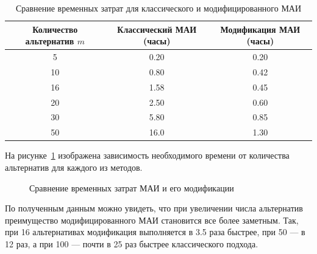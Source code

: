 \begin{landscape}
\vspace*{\fill}
\begin{table}[H]
\centering
\caption{Сравнение временных затрат для классического и модифицированного МАИ}
\label{tab:methods_comparison}
\begin{tabular}{|c|c|c|}
\hline
\textbf{Количество альтернатив \(m\)} & \textbf{Классический МАИ (часы)} & \textbf{Модификация МАИ (часы)} \\
\hline
5 & 0.20 & 0.20 \\
\hline
10 & 0.80 & 0.42\\
\hline
16 & 1.58 & 0.45 \\
\hline
20 & 2.50 & 0.60 \\
\hline
30 & 5.80 & 0.85 \\
\hline
50 & 16.0 & 1.30 \\
\hline
\end{tabular}
\end{table}
\vspace*{\fill}
\end{landscape}

На рисунке~\ref{fig:time_comparison} изображена зависимость необходимого времени от количества альтернатив для каждого из методов.
\begin{figure}[H]
\centering
{}
\caption{Сравнение временных затрат МАИ и его модификации}
\label{fig:time_comparison}
\end{figure}

По полученным данным можно увидеть, что при увеличении числа альтернатив преимущество модифицированного МАИ становится все более заметным. 
Так, при 16 альтернативах модификация выполняется в 3.5 раза быстрее, при 50 --- в 12 раз, а при 100 --- почти в 25 раз быстрее классического подхода. 

